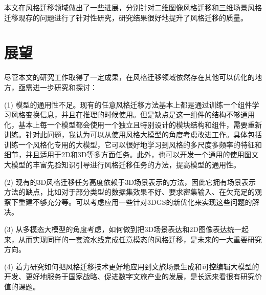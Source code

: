 \par 本文在风格迁移领域做出了一些进展，分别针对二维图像风格迁移和三维场景风格迁移现存的问题进行了针对性研究，研究结果很好地提升了风格迁移的质量。
\section{展望}
尽管本文的研究工作取得了一定成果，在风格迁移领域依然存在其他可以优化的地方，亟需进一步研究和探讨：
\par (1) 模型的通用性不足。现有的任意风格迁移方法基本上都是通过训练一个组件学习风格变换信息，并且在推理的时候使用。但是缺点是这一组件的结构不够通用化，基本上每一个模型都会使用一个独立且特别设计的模块结构和组件，需要重新训练。针对此问题，我认为可以从使用风格大模型的角度考虑改进工作。具体包括训练一个风格化专用的大模型，它可以很好地学习到风格的多尺度多频率的特征和细节，并且适用于2D和3D等多方面任务。此外，也可以开发一个通用的使用图文大模型的丰富先验知识引导进行风格迁移任务的方法，提高模型的通用性。
\par (2) 现有的3D风格迁移任务高度依赖于3D场景表示的方法，因此它拥有场景表示方法的缺点，比如对于部分类型的数据集效果不好、要求密集输入、在欠充足的观察下重建不够充分等。可以考虑应用一些针对3DGS的新优化来实现这些问题的解决。
\par (3) 从多模态大模型的角度考虑，如何做到把3D场景表达和2D图像表达统一起来，从而实现同样的一套流水线完成任意模态的风格迁移，是未来的一大重要研究方向。
\par (4) 着力研究如何把风格迁移技术更好地应用到文旅场景生成和可控编辑大模型的开发、更好地服务于国家战略、促进数字文旅产业的发展，是长远来看很有研究价值的课题。